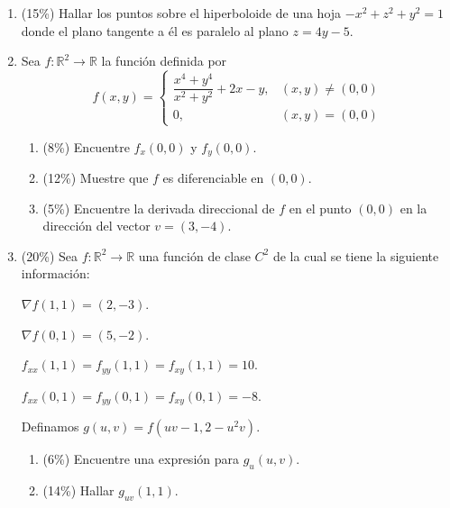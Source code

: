 \documentclass[11pt]{article}
\begin{document}
\begin{enumerate}
\begin{enumerate}
\vspace{4pt}
\noindent i. $f(x,y)=\dfrac{1}{x^2+y^2+1}$. \hspace{1cm} ii. $f(x,y)=xy$. \hspace{1cm} iii. $f(x,y)=x^2+y^2$. \hspace{1cm} iv. Ninguna de las anteriores.
\end{enumerate}

\newpage
\item{} (15\%) Hallar los puntos sobre el hiperboloide de una hoja $-x^2+z^2+y^2=1$ donde el plano tangente a él es paralelo al plano $z=4y-5$.

\vspace{8cm}

\item{} Sea $f:\mathbb{R}^2\to\mathbb{R}$ la función definida por
\[
f(x,y) = \left\{
\begin{array}{ll}
\dfrac{x^4+y^4}{x^2+y^2}+2x-y, & (x,y)\neq(0,0)\\[6pt]
0, & (x,y)=(0,0)
\end{array}
\right.
\]
\begin{enumerate}
\item{} (8\%) Encuentre $f_x(0,0)$ y $f_y(0,0)$.
\item{} (12\%) Muestre que $f$ es diferenciable en $(0,0)$.
\item{} (5\%) Encuentre la derivada direccional de $f$ en el punto $(0,0)$ en la dirección del vector $v=(3,-4)$.
\end{enumerate}

\vspace{8cm}

\newpage
\item{} (20\%) Sea $f:\mathbb{R}^2\to\mathbb{R}$ una función de clase $C^2$ de la cual se tiene la siguiente información:

\vspace{4pt}
\noindent $\nabla f(1,1)=(2,-3)$.

\noindent $\nabla f(0,1)=(5,-2)$.

\noindent $f_{xx}(1,1)=f_{yy}(1,1)=f_{xy}(1,1)=10$.

\noindent $f_{xx}(0,1)=f_{yy}(0,1)=f_{xy}(0,1)=-8$.

\vspace{4pt}
\noindent Definamos $g(u,v)=f(uv-1,2-u^2v)$.
\begin{enumerate}
\item{} (6\%) Encuentre una expresión para $g_u(u,v)$.
\item{} (14\%) Hallar $g_{uv}(1,1)$.
\end{enumerate}

\vspace{8cm}
\end{enumerate}

\examfooter
\end{document}
